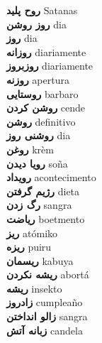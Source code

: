\textbf{ روح پلید  } Satanas \\
\textbf{ روز روشن  } dia \\
\textbf{ روز  } dia \\
\textbf{ روزانه  } diariamente \\
\textbf{ روزبروز  } diariamente \\
\textbf{ روزنه  } apertura \\
\textbf{ روستایی  } barbaro \\
\textbf{ روشن کردن  } cende \\
\textbf{ روشن  } definitivo \\
\textbf{ روشنی روز  } dia \\
\textbf{ روغن  } krèm \\
\textbf{ رویا دیدن  } soña \\
\textbf{ رویداد  } acontecimento \\
\textbf{ رژیم گرفتن  } dieta \\
\textbf{ رگ زدن  } sangra \\
\textbf{ ریاضت  } boetmento \\
\textbf{ ریز  } atómiko \\
\textbf{ ریزه  } puiru \\
\textbf{ ریسمان  } kabuya \\
\textbf{ ریشه نکردن  } abortá \\
\textbf{ ریشه  } insekto \\
\textbf{ زادروز  } cumpleaño \\
\textbf{ زالو انداختن  } sangra \\
\textbf{ زبانه آتش  } candela \\
